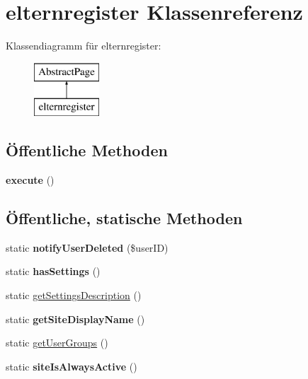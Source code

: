 \hypertarget{classelternregister}{}\section{elternregister Klassenreferenz}
\label{classelternregister}
Klassendiagramm für elternregister\+:\begin{figure}[H]
\begin{center}
\leavevmode
\includegraphics[height=2.000000cm]{classelternregister}
\end{center}
\end{figure}
\subsection*{Öffentliche Methoden}
\begin{DoxyCompactItemize}
\item 
\mbox{\label{classelternregister_ab23f5172ea1a3819f4857079bebf1ef1}} 
{\bfseries execute} ()
\end{DoxyCompactItemize}
\subsection*{Öffentliche, statische Methoden}
\begin{DoxyCompactItemize}
\item 
\mbox{\label{classelternregister_a16798430f5d971c61ec9f4ad0039cc16}} 
static {\bfseries notify\+User\+Deleted} (\$user\+ID)
\item 
\mbox{\label{classelternregister_a7599c499a7b35a80963ea10194431070}} 
static {\bfseries has\+Settings} ()
\item 
static \mbox{\hyperlink{classelternregister_a576687d2b88e2827b8d3fe12db9a6eb4}{get\+Settings\+Description}} ()
\item 
\mbox{\label{classelternregister_ae09429751cfea84aa594fdf89927aa25}} 
static {\bfseries get\+Site\+Display\+Name} ()
\item 
static \mbox{\hyperlink{classelternregister_a3e4fdad46bff91acbe57ff27d9acc3d9}{get\+User\+Groups}} ()
\item 
\mbox{\label{classelternregister_ab2607b4b97c555b98e116a0d1e8c78be}} 
static {\bfseries site\+Is\+Always\+Active} ()
\end{DoxyCompactItemize}
